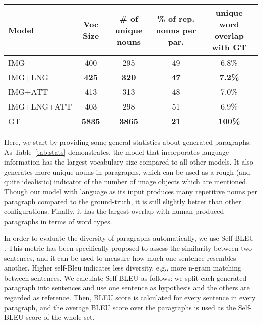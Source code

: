 \documentclass[11pt,a4paper]{article}
\begin{document}

\begin{table*}[]
    \footnotesize
    \centering
    \begin{tabular}{|l|c|c|c|c|}
    \hline
       \textbf{Model}  &  \textbf{Voc Size} & \textbf{\# of unique nouns} & \textbf{\% of rep. nouns per par.} & \textbf{unique word overlap with GT} \\
    \hline
      IMG   & 400 & 295 & 49 & 6.8\% \\
    \hline
      IMG+LNG   & \textbf{425} & \textbf{320} & \textbf{47} & \textbf{7.2\%} \\
    \hline
      IMG+ATT   & 413 & 313 & 48 & 7.0\% \\
    \hline
      IMG+LNG+ATT   & 403 & 298 & 51 & 6.9\% \\
    \hline
    \hline
      GT & \textbf{5835} & \textbf{3865} & \textbf{21} & \textbf{100\%} \\
    \hline
    \end{tabular}
    \caption{General statistics for generated image paragraphs.}
    \label{tab:stats}
\end{table*}

Here, we start by providing some general statistics about generated paragraphs.
As Table~\ref{tab:stats} demonstrates, the model that incorporates language information has the largest vocabulary size compared to all other models.
It also generates more unique nouns in paragraphs, which can be used as a rough (and quite idealistic) indicator of the number of image objects which are mentioned.
Though our model with language as its input produces many repetitive nouns per paragraph compared to the ground-truth, it is still slightly better than other configurations.
Finally, it has the largest overlap with human-produced paragraphs in terms of word types.

In order to evaluate the diversity of paragraphs automatically, we use Self-BLEU \cite{Zhu2018selfbleu}.
This metric has been specifically proposed to assess the similarity between two sentences, and it can be used to measure how much one sentence resembles another.
Higher self-Bleu indicates less diversity, e.g., more n-gram matching between sentences.
We calculate Self-BLEU as follows: we split each generated paragraph into sentences and use one sentence as hypothesis and the others are regarded as reference.
Then, BLEU score is calculated for every sentence in every paragraph, and the average BLEU score over the paragraphs is used as the Self-BLEU score of the whole set.
\end{document}
